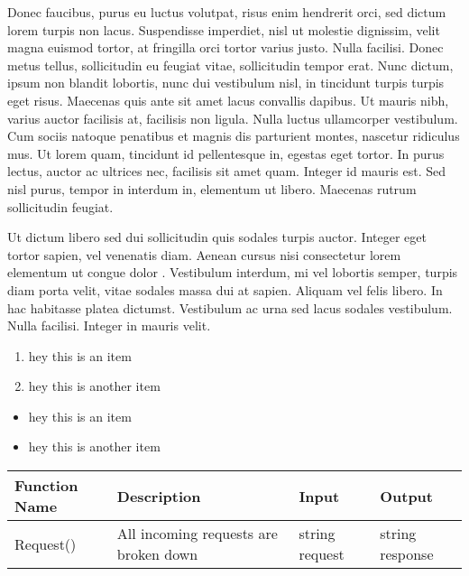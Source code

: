 Donec faucibus, purus eu luctus volutpat, risus enim hendrerit orci, sed dictum
lorem turpis non lacus. Suspendisse imperdiet, nisl ut molestie dignissim,
velit magna euismod tortor, at fringilla orci tortor varius justo. Nulla
facilisi. Donec metus tellus, sollicitudin eu feugiat vitae, sollicitudin
tempor erat. Nunc dictum, ipsum non blandit lobortis, nunc dui vestibulum nisl,
in tincidunt turpis turpis eget risus. Maecenas quis ante sit amet lacus
convallis dapibus. Ut mauris nibh, varius auctor facilisis at, facilisis non
ligula. Nulla luctus ullamcorper vestibulum. Cum sociis natoque penatibus et
magnis dis parturient montes, nascetur ridiculus mus. Ut lorem quam, tincidunt
id pellentesque in, egestas eget tortor. In purus lectus, auctor ac ultrices
nec, facilisis sit amet quam. Integer id mauris est. Sed nisl purus, tempor in
interdum in, elementum ut libero. Maecenas rutrum sollicitudin feugiat.

Ut dictum libero sed dui sollicitudin quis sodales turpis auctor. Integer eget
tortor sapien, vel venenatis diam. Aenean cursus nisi consectetur lorem
elementum ut congue dolor . Vestibulum interdum, mi vel lobortis
semper, turpis diam porta velit, vitae sodales massa dui at sapien. Aliquam vel
felis libero. In hac habitasse platea dictumst. Vestibulum ac urna sed lacus
sodales vestibulum. Nulla facilisi. Integer in mauris velit.

\begin{enumerate}
  \item hey this is an item
  \item hey this is another item
\end{enumerate}

\begin{itemize}
  \item hey this is an item
  \item hey this is another item
\end{itemize}

{\footnotesize
\begin{tabular}{ | p{2.5cm} | p{6cm} | p{2.5cm} | p{2.6cm} | }

  \hline
  {\bf Function Name} & 
  {\bf Description} & 
  {\bf Input} & 
  {\bf Output} \\ 
  \hline
    
  Request() 
    & All incoming requests are broken down 
    & string request
    & string response \\ 
  \hline

\end{tabular}
}


